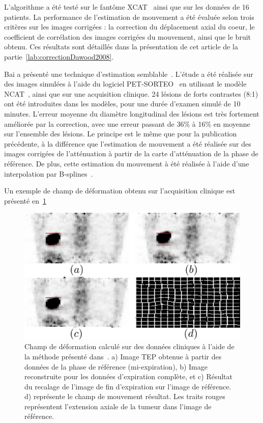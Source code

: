 L'algorithme a été testé sur le fantôme XCAT~\cite{segars2009mcatoverview} ainsi que sur les données de 16 patients. La performance de l'estimation de mouvement a été évaluée selon trois critères sur les images corrigées : la correction du déplacement axial du coeur, le coefficient de corrélation des images corrigées du mouvement, ainsi que le bruit obtenu. Ces résultats sont détaillés dans la présentation de cet article de la partie~\ref{lab:correctionDawood2008}.

Bai a présenté une technique d'estimation semblable~\cite{bai2009regularized}. L'étude a été réalisée sur des images simulées à l'aide du logiciel PET-SORTEO~\cite{reilhac2005pet} en utilisant le modèle NCAT~\cite{segars2009mcatoverview}, ainsi que sur une acquisition clinique. 24 lésions de forts contrastes (8:1) ont été introduites dans les modèles, pour une durée d'examen simulé de 10 minutes. L'erreur moyenne du diamètre longitudinal des lésions est très fortement améliorée par la correction, avec une erreur passant de 36\% à 16\% en moyenne sur l'ensemble des lésions. Le principe est le même que pour la publication précédente, à la différence que l'estimation de mouvement a été réalisée sur des images corrigées de l'atténuation à partir de la carte d'atténuation de la phase de référence. De plus, cette estimation du mouvement à été réalisée à l'aide d'une interpolation par B-splines~\cite{thevenaz2000optimization}.

Un exemple de champ de déformation obtenu sur l'acquisition clinique est présenté en~\ref{fig:champMouvementBai}

\begin{figure}[h!]
	\begin{center}
		\includegraphics[width=12cm]{images/champDeformBai2}
	\end{center}
	\caption[Exemple de champ de mouvement]{Champ de déformation calculé sur des données cliniques à l'aide de la méthode présenté dans~\cite{bai2009regularized}. a) Image TEP obtenue à partir des données de la phase de référence  (mi-expiration), b) Image reconstruite pour les données d'expiration complète, et c) Résultat du recalage de l'image de fin d'expiration sur l'image de référence. d) représente le champ de mouvement résultat. Les traits rouges représentent l'extension axiale de la tumeur dans l'image de référence.} 
	\label{fig:champMouvementBai}
\end{figure}

